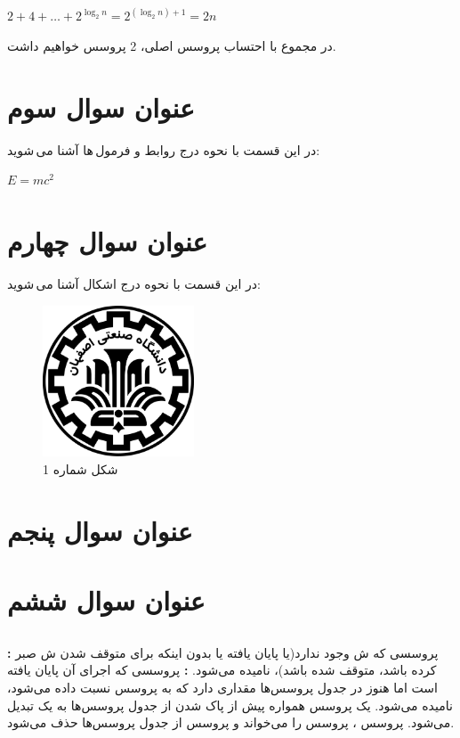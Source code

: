 \documentclass{article}
\begin{document}
\begin{center}
$
2+4+\ldots+2^{\log_2 n}=2^{(\log_2 n)+1}=2n
$
\end{center}
در مجموع با احتساب پروسس  اصلی، 2 پروسس خواهیم داشت.

\section{عنوان سوال سوم}
در این قسمت با نحوه درج روابط و فرمول\,ها آشنا می\,شوید:
\begin{center}
$E = m{c}^{2}$
\end{center}

\section{عنوان سوال چهارم}
در این قسمت با نحوه درج اشکال آشنا می\,شوید:
\begin{figure}[H]
    \centering
    \includegraphics[width=0.4\textwidth]{IUT Logo.png}
    \caption{شکل شماره 1}
    \label{fig:fig1}
\end{figure}

\section{عنوان سوال پنجم}
\subsection{}
\lr{}

\section{عنوان سوال ششم}
\subsection{}
\textbf{:}
پروسسی که ش وجود ندارد(یا پایان یافته یا بدون اینکه برای متوقف شدن ش صبر کرده باشد، متوقف شده باشد)،  نامیده می‌شود.
\newline
\textbf{:}
پروسسی که اجرای آن پایان یافته است اما هنوز در جدول پروسس‌ها مقداری دارد که به پروسس  نسبت داده می‌شود،  نامیده می‌شود. یک پروسس  همواره پیش از پاک شدن از جدول پروسس‌ها به یک  تبدیل می‌شود. پروسس ،  پروسس  را می‌خواند و پروسس  از جدول پروسس‌ها حذف می‌شود.
\end{document}
